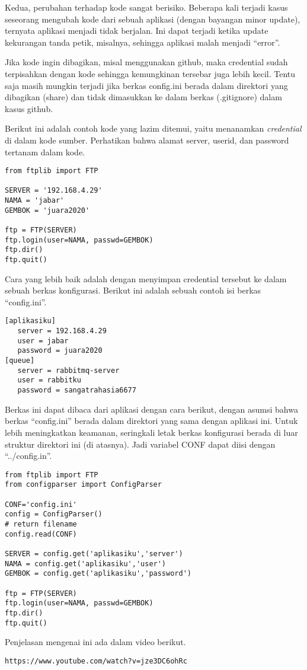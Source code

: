 Kedua, perubahan terhadap kode sangat berisiko. Beberapa kali terjadi
kasus seseorang mengubah kode dari sebuah aplikasi (dengan bayangan
minor update), ternyata aplikasi menjadi tidak berjalan.
Ini dapat terjadi ketika update kekurangan tanda petik, misalnya,
sehingga aplikasi malah menjadi ``error''.

Jika kode ingin dibagikan, misal menggunakan github, maka credential
sudah terpisahkan dengan kode sehingga kemungkinan tersebar juga lebih kecil.
Tentu saja masih mungkin terjadi jika berkas config.ini berada dalam
direktori yang dibagikan (share) dan tidak dimasukkan ke dalam
berkas (.gitignore) dalam kasus github.

Berikut ini adalah contoh kode yang lazim ditemui, yaitu menanamkan
{\em credential} di dalam kode sumber. Perhatikan bahwa alamat server,
userid, dan password tertanam dalam kode.

\begin{verbatim}
from ftplib import FTP

SERVER = '192.168.4.29'
NAMA = 'jabar'
GEMBOK = 'juara2020'

ftp = FTP(SERVER)
ftp.login(user=NAMA, passwd=GEMBOK)
ftp.dir()
ftp.quit()
\end{verbatim}

Cara yang lebih baik adalah dengan menyimpan credential tersebut
ke dalam sebuah berkas konfigurasi. Berikut ini adalah sebuah
contoh isi berkas ``config.ini''.

\begin{verbatim}
[aplikasiku]
   server = 192.168.4.29
   user = jabar
   password = juara2020
[queue]
   server = rabbitmq-server
   user = rabbitku
   password = sangatrahasia6677
\end{verbatim}

Berkas ini dapat dibaca dari aplikasi dengan cara berikut, dengan asumsi
bahwa berkas ``config.ini'' berada dalam direktori yang sama dengan
aplikasi ini. Untuk lebih meningkatkan keamanan, seringkali letak berkas
konfigurasi berada di luar struktur direktori ini (di atasnya). Jadi
variabel CONF dapat diisi dengan ``../config.in''.


\begin{verbatim}
from ftplib import FTP
from configparser import ConfigParser

CONF='config.ini'
config = ConfigParser()
# return filename
config.read(CONF)

SERVER = config.get('aplikasiku','server')
NAMA = config.get('aplikasiku','user')
GEMBOK = config.get('aplikasiku','password')

ftp = FTP(SERVER)
ftp.login(user=NAMA, passwd=GEMBOK)
ftp.dir()
ftp.quit()
\end{verbatim}

Penjelasan mengenai ini ada dalam video berikut.
\begin{verbatim}
https://www.youtube.com/watch?v=jze3DC6ohRc
\end{verbatim}
